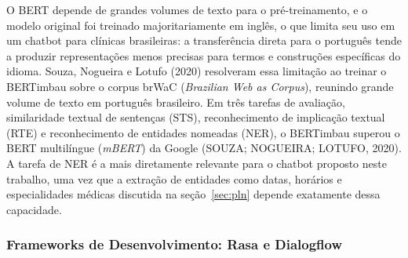 \documentclass[12pt,a4paper]{extarticle}
\begin{document}

O BERT depende de grandes volumes de texto para o pré-treinamento, e o modelo original foi treinado majoritariamente em inglês, o que limita seu uso em um chatbot para clínicas brasileiras: a transferência direta para o português tende a produzir representações menos precisas para termos e construções específicas do idioma. Souza, Nogueira e Lotufo (2020) resolveram essa limitação ao treinar o BERTimbau sobre o corpus brWaC (\textit{Brazilian Web as Corpus}), reunindo grande volume de texto em português brasileiro. Em três tarefas de avaliação, similaridade textual de sentenças (STS), reconhecimento de implicação textual (RTE) e reconhecimento de entidades nomeadas (NER), o BERTimbau superou o BERT multilíngue (\textit{mBERT}) da Google (SOUZA; NOGUEIRA; LOTUFO, 2020). A tarefa de NER é a mais diretamente relevante para o chatbot proposto neste trabalho, uma vez que a extração de entidades como datas, horários e especialidades médicas discutida na seção~\ref{sec:pln} depende exatamente dessa capacidade.

\subsubsection{Frameworks de Desenvolvimento: Rasa e Dialogflow}
\end{document}
